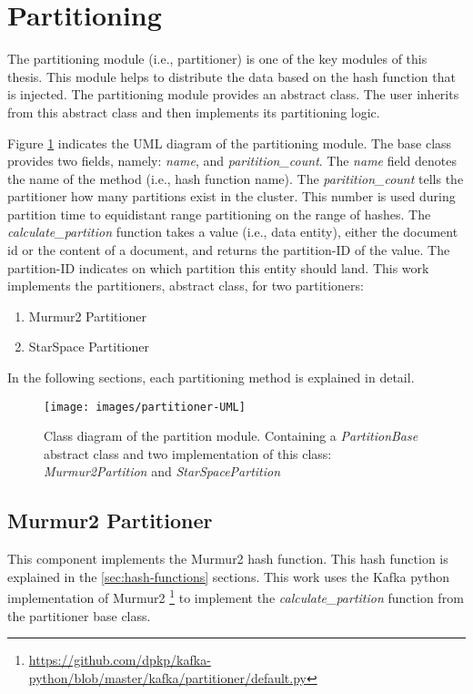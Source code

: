 \section{Partitioning}
\label{sec:partitioning}
The partitioning module (i.e., partitioner) is one of the key modules of this thesis. This module helps to distribute the data based on the hash function that is injected. The partitioning module provides an abstract class. The user inherits from this abstract class and then implements its partitioning logic. 


Figure \ref{fig:partitioner-uml} indicates the UML diagram of the partitioning module. The base class provides two fields, namely: \emph{name}, and \emph{paritition\_count}. The \emph{name} field denotes the name of the method (i.e., hash function name). The \emph{paritition\_count} tells the partitioner how many partitions exist in the cluster. This number is used during partition time to equidistant range partitioning on the range of hashes. The \emph{calculate\_partition} function takes a value (i.e., data entity), either the document id or the content of a document, and returns the partition-ID of the value. The partition-ID indicates on which partition this entity should land. This work implements the partitioners, abstract class, for two partitioners:

\begin{enumerate}
    \item Murmur2 Partitioner
    \item StarSpace Partitioner
\end{enumerate}

In the following sections, each partitioning method is explained in detail.

\begin{figure}[!h]
    \centering
    \texttt{[image: images/partitioner-UML]}
    \caption{Class diagram of the partition module. Containing a \emph{PartitionBase} abstract class and two implementation of this class: \emph{Murmur2Partition} and \emph{StarSpacePartition}}
    \label{fig:partitioner-uml}
\end{figure}


\subsection{Murmur2 Partitioner}
\label{subsec:partitioning-murmur2}
This component implements the Murmur2 hash function. This hash function is explained in the \ref{sec:hash-functions} sections. This work uses the Kafka python implementation of Murmur2 \footnote{\url{https://github.com/dpkp/kafka-python/blob/master/kafka/partitioner/default.py}} to implement the \emph{calculate\_partition} function from the partitioner base class.

